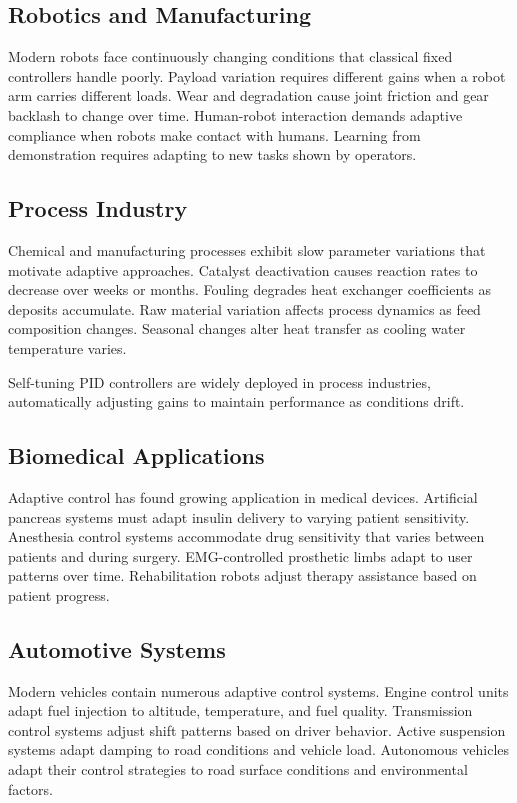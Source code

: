 \subsection{Robotics and Manufacturing}

Modern robots face continuously changing conditions that classical fixed controllers handle poorly. Payload variation requires different gains when a robot arm carries different loads. Wear and degradation cause joint friction and gear backlash to change over time. Human-robot interaction demands adaptive compliance when robots make contact with humans. Learning from demonstration requires adapting to new tasks shown by operators.

\subsection{Process Industry}

Chemical and manufacturing processes exhibit slow parameter variations that motivate adaptive approaches. Catalyst deactivation causes reaction rates to decrease over weeks or months. Fouling degrades heat exchanger coefficients as deposits accumulate. Raw material variation affects process dynamics as feed composition changes. Seasonal changes alter heat transfer as cooling water temperature varies.

Self-tuning PID controllers are widely deployed in process industries, automatically adjusting gains to maintain performance as conditions drift.

\subsection{Biomedical Applications}

Adaptive control has found growing application in medical devices. Artificial pancreas systems must adapt insulin delivery to varying patient sensitivity. Anesthesia control systems accommodate drug sensitivity that varies between patients and during surgery. EMG-controlled prosthetic limbs adapt to user patterns over time. Rehabilitation robots adjust therapy assistance based on patient progress.

\subsection{Automotive Systems}

Modern vehicles contain numerous adaptive control systems. Engine control units adapt fuel injection to altitude, temperature, and fuel quality. Transmission control systems adjust shift patterns based on driver behavior. Active suspension systems adapt damping to road conditions and vehicle load. Autonomous vehicles adapt their control strategies to road surface conditions and environmental factors.

